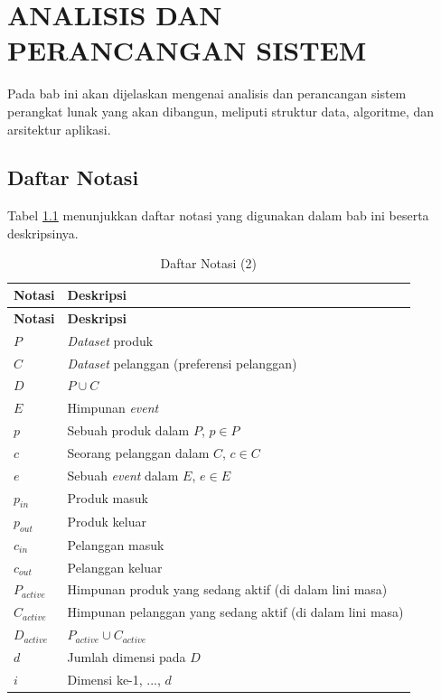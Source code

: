\chapter{ANALISIS DAN PERANCANGAN SISTEM} \label{chapter:analisis dan perancangan sistem}
\tab Pada bab ini akan dijelaskan mengenai analisis dan perancangan sistem perangkat lunak yang akan dibangun, meliputi struktur data, algoritme, dan arsitektur aplikasi. 

\section{Daftar Notasi}
\tab Tabel \ref{tab:daftar-notasi-2} menunjukkan daftar notasi yang digunakan dalam bab ini beserta deskripsinya.

\begin{longtable}{| p{3cm} | p{6cm} |} 
	\caption{Daftar Notasi (2) \label{tab:daftar-notasi-2}}\\
	\hline
	\textbf{Notasi} & \textbf{Deskripsi}\\ \hline
	\endfirsthead
	\hline
	\textbf{Notasi} & \textbf{Deskripsi}\\ \hline
	\endhead
	$P$ & \textit{Dataset} produk\\ \hline
	$C$ & \textit{Dataset} pelanggan (preferensi pelanggan)\\ \hline
	$D$ & $P \cup C$ \\ \hline
	$E$ & Himpunan \textit{event} \\ \hline
	$p$ & Sebuah produk dalam $P$, $p \in P$\\ \hline
	$c$ & Seorang pelanggan dalam $C$, $c \in C$\\ \hline
	$e$ & Sebuah \textit{event} dalam $E$, $e \in E$ \\ \hline
	$p_{in}$ & Produk masuk \\ \hline
	$p_{out}$ & Produk keluar \\ \hline
	$c_{in}$ & Pelanggan masuk \\ \hline
	$c_{out}$ & Pelanggan keluar \\ \hline
	$P_{active}$ & Himpunan produk yang sedang aktif (di dalam lini masa) \\ \hline	
	$C_{active}$ & Himpunan pelanggan yang sedang aktif (di dalam lini masa) \\ \hline	
	$D_{active}$ & $P_{active} \cup C_{active}$ \\ \hline	
	$d$ & Jumlah dimensi pada $D$\\ \hline
	$i$ & Dimensi ke-1, ..., $d$\\ \hline

\end{longtable}
